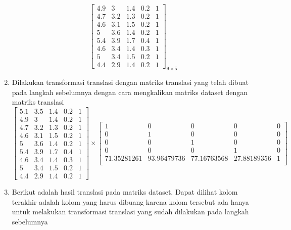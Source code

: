 \begin{enumerate}
\[\begin{bmatrix}
            4.9		&		3		&		1.4		&		0.2		&		1 \\
            4.7		&		3.2		&		1.3		&		0.2		&		1 \\
            4.6		&		3.1		&		1.5		&		0.2		&		1 \\
            5		&		3.6		&		1.4		&		0.2		&		1 \\
            5.4		&		3.9		&		1.7		&		0.4		&		1 \\
            4.6		&		3.4		&		1.4		&		0.3		&		1 \\
            5		&		3.4		&		1.5		&		0.2		&		1 \\
            4.4		&		2.9		&		1.4		&		0.2		&		1
        \end{bmatrix}_{9\times 5}
    \]
    \item Dilakukan transformasi translasi dengan matriks translasi yang telah dibuat pada langkah sebelumnya dengan cara mengkalikan matriks dataset dengan matriks translasi
    \[
        \begin{bmatrix}
            5.1		&		3.5		&		1.4		&		0.2		&		1 \\
            4.9		&		3		&		1.4		&		0.2		&		1 \\
            4.7		&		3.2		&		1.3		&		0.2		&		1 \\
            4.6		&		3.1		&		1.5		&		0.2		&		1 \\
            5		&		3.6		&		1.4		&		0.2		&		1 \\
            5.4		&		3.9		&		1.7		&		0.4		&		1 \\
            4.6		&		3.4		&		1.4		&		0.3		&		1 \\
            5		&		3.4		&		1.5		&		0.2		&		1 \\
            4.4		&		2.9		&		1.4		&		0.2		&		1
        \end{bmatrix} 
        \times
        \begin{bmatrix}
            1				&		0				&		0				&		0				&		0 \\
            0				&		1				&		0				&		0				&		0 \\
            0				&		0				&		1				&		0				&		0 \\
            0				&		0				&		0				&		1				&		0 \\
            71.35281261		&		93.96479736		&		77.16763568		&		27.88189356		&		1 \\
        \end{bmatrix} 
    \]
    \item Berikut adalah hasil translasi pada matriks dataset. Dapat dilihat kolom terakhir adalah kolom yang harus dibuang karena kolom tersebut ada hanya untuk melakukan transformasi translasi yang sudah dilakukan pada langkah sebelumnya

\end{enumerate}
